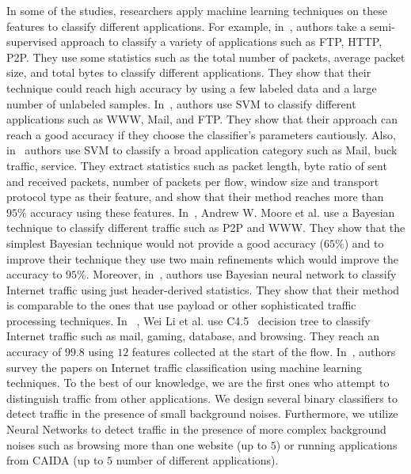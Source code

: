 In some of the studies, researchers apply machine learning techniques on these features to classify different applications.
For example, in~\cite{semi}, authors take a semi-supervised approach to classify a variety of applications such as FTP, HTTP, P2P. They use some statistics such as the total number of packets, average packet size, and total bytes to classify different applications. They show that their technique could reach high accuracy by using a few labeled data and a large number of unlabeled samples. In~\cite{trafficClassSVM}, authors use SVM to classify different applications such as WWW, Mail, and FTP. They show that their approach can reach a good accuracy if they choose the classifier's parameters cautiously. Also, in~\cite{svm2} authors use SVM to classify a broad application category such as Mail, buck traffic, service. They extract statistics such as packet length, byte ratio of sent and received packets, number of packets per flow, window size and transport protocol type as their feature, and show that their method reaches more than $95\%$ accuracy using these features.
In~\cite{MooreZ05}, Andrew W. Moore et al. use a Bayesian technique to classify different traffic such as P2P and WWW. They show that the simplest Bayesian technique would not provide a good accuracy ($65\%$) and to improve their technique they use two main refinements which would improve the accuracy to $95\%$. Moreover, in~\cite{bays2}, authors use Bayesian neural network to classify Internet traffic using just header-derived statistics. They show that their method is comparable to the ones that use payload or other sophisticated traffic processing techniques. In ~\cite{mlEffi}, Wei Li et al. use C4.5~\cite{tree} decision tree to classify Internet traffic such as mail, gaming, database, and browsing. They reach an accuracy of $99.8$ using $12$ features collected at the start of the flow.
  In~\cite{survey_ml, myth}, authors survey the papers on Internet traffic classification using machine learning techniques. 
  To the best of our knowledge, we are the first ones who attempt to distinguish \bc traffic from other applications. We design several binary classifiers to detect \bc traffic in the presence of small background noises. Furthermore, we utilize Neural Networks to detect \bc traffic in the presence of more complex background noises such as browsing more than one website (up to $5$) or running applications from CAIDA (up to $5$ number of different applications).

